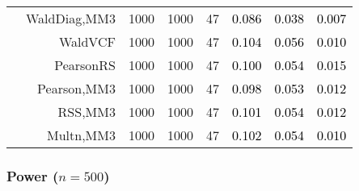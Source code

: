 \documentclass[
]{article}
\begin{document}
\begin{table}[H]
{\begin{tabular}[t]{lrrrrrrr}
\hspace{1em} & WaldDiag,MM3 & 1000 & 1000 & 47 & \textcolor{black}{0.086} & \textcolor{black}{0.038} & \textcolor{black}{0.007}\\

\hspace{1em} & WaldVCF & 1000 & 1000 & 47 & \textcolor{black}{0.104} & \textcolor{black}{0.056} & \textcolor{black}{0.010}\\

\hspace{1em} & PearsonRS & 1000 & 1000 & 47 & \textcolor{black}{0.100} & \textcolor{black}{0.054} & \textcolor{black}{0.015}\\

\hspace{1em} & Pearson,MM3 & 1000 & 1000 & 47 & \textcolor{black}{0.098} & \textcolor{black}{0.053} & \textcolor{black}{0.012}\\

\hspace{1em} & RSS,MM3 & 1000 & 1000 & 47 & \textcolor{black}{0.101} & \textcolor{black}{0.054} & \textcolor{black}{0.012}\\

\hspace{1em} & Multn,MM3 & 1000 & 1000 & 47 & \textcolor{black}{0.102} & \textcolor{black}{0.054} & \textcolor{black}{0.010}\\
\bottomrule
\end{tabular}}
\endgroup{}
\end{table}

\hypertarget{power-n500}{%
\subsubsection{\texorpdfstring{Power
(\(n=500\))}{Power (n=500)}}\label{power-n500}}
\end{document}
